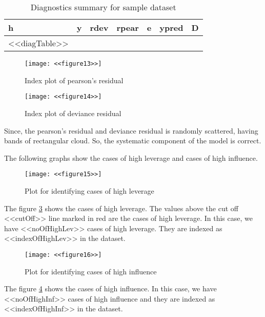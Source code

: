 \documentclass[a4paper,12pt, notitlepage]{article}
\begin{document}
\begin{table}[!htbp]
\centering
\begin{tabular}{ |l|r|r|r|r|r|r| }
\hline \rowcolor{Gray}
h & y & rdev & rpear & e & ypred & D\\
\hline
<<diagTable>>
\hline
\end{tabular}
\caption{Diagnostics summary for sample dataset}
\label{table:6}
\end{table}

\begin{figure}[!htbp]
    \centering
    \texttt{[image: <<figure13>>]}
    \caption{Index plot of pearson's residual}
    \label{fig:rpear1}
\end{figure}

\begin{figure}[!htbp]
    \centering
    \texttt{[image: <<figure14>>]}
    \caption{Index plot of deviance residual}
    \label{fig:rdev1}
\end{figure}

Since, the pearson's residual and deviance residual is randomly scattered, having bands of rectangular cloud. So, the systematic component of the model is correct.

The following graphs show the cases of high leverage and cases of high influence.

\begin{figure}[!htbp]
    \centering
    \texttt{[image: <<figure15>>]}
    \caption{Plot for identifying cases of high leverage}
    \label{fig:highleverage1}
\end{figure}

The figure \ref{fig:highleverage1} shows the cases of high leverage. The values above the cut off <<cutOff>> line marked in red are the cases of high leverage. In this case, we have <<noOfHighLev>> cases of high leverage. They are indexed as <<indexOfHighLev>> in the dataset.

\begin{figure}[!htbp]
    \centering
    \texttt{[image: <<figure16>>]}
    \caption{Plot for identifying cases of high influence}
    \label{fig:highInfluence1}
\end{figure}

The figure \ref{fig:highInfluence1} shows the cases of high influence. In this case, we have <<noOfHighInf>> cases of high influence and they are indexed as <<indexOfHighInf>> in the dataset.
\end{document}
